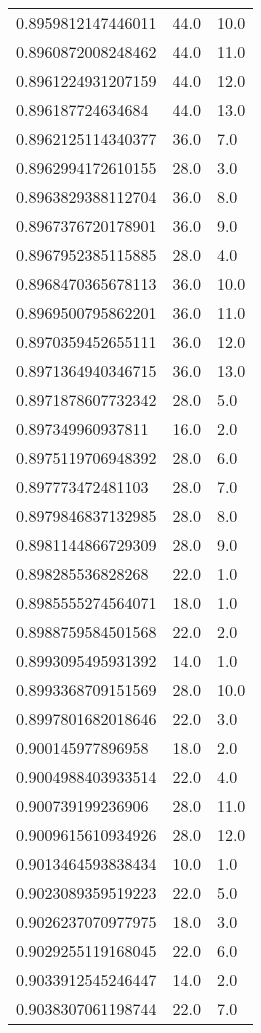 \begin{center}
\begin{supertabular}[H]{p{0.30\textwidth}p{0.05\textwidth}p{0.05\textwidth}}
0.8959812147446011 & 44.0 & 10.0 \\ 
0.8960872008248462 & 44.0 & 11.0 \\ 
0.8961224931207159 & 44.0 & 12.0 \\ 
0.896187724634684 & 44.0 & 13.0 \\ 
0.8962125114340377 & 36.0 & 7.0 \\ 
0.8962994172610155 & 28.0 & 3.0 \\ 
0.8963829388112704 & 36.0 & 8.0 \\ 
0.8967376720178901 & 36.0 & 9.0 \\ 
0.8967952385115885 & 28.0 & 4.0 \\ 
0.8968470365678113 & 36.0 & 10.0 \\ 
0.8969500795862201 & 36.0 & 11.0 \\ 
0.8970359452655111 & 36.0 & 12.0 \\ 
0.8971364940346715 & 36.0 & 13.0 \\ 
0.8971878607732342 & 28.0 & 5.0 \\ 
0.897349960937811 & 16.0 & 2.0 \\ 
0.8975119706948392 & 28.0 & 6.0 \\ 
0.897773472481103 & 28.0 & 7.0 \\ 
0.8979846837132985 & 28.0 & 8.0 \\ 
0.8981144866729309 & 28.0 & 9.0 \\ 
0.898285536828268 & 22.0 & 1.0 \\ 
0.8985555274564071 & 18.0 & 1.0 \\ 
0.8988759584501568 & 22.0 & 2.0 \\ 
0.8993095495931392 & 14.0 & 1.0 \\ 
0.8993368709151569 & 28.0 & 10.0 \\ 
0.8997801682018646 & 22.0 & 3.0 \\ 
0.900145977896958 & 18.0 & 2.0 \\ 
0.9004988403933514 & 22.0 & 4.0 \\ 
0.900739199236906 & 28.0 & 11.0 \\ 
0.9009615610934926 & 28.0 & 12.0 \\ 
0.9013464593838434 & 10.0 & 1.0 \\ 
0.9023089359519223 & 22.0 & 5.0 \\ 
0.9026237070977975 & 18.0 & 3.0 \\ 
0.9029255119168045 & 22.0 & 6.0 \\ 
0.9033912545246447 & 14.0 & 2.0 \\ 
0.9038307061198744 & 22.0 & 7.0 \\ 

\end{supertabular}
\end{center}
